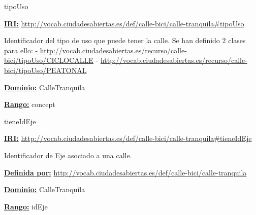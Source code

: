 \begin{mybox}{tipoUso}
\begin{flushleft}
\underline{\textbf{IRI:}}
\url{http://vocab.ciudadesabiertas.es/def/calle-bici/calle-tranquila#tipoUso}
\newline

Identificador del tipo de uso que puede tener la calle. Se han definido 2 clases para ello:
\newline -	\url{http://vocab.ciudadesabiertas.es/recurso/calle-bici/tipoUso/CICLOCALLE}
\newline -	 \url{http://vocab.ciudadesabiertas.es/recurso/calle-bici/tipoUso/PEATONAL}
\newline



\underline{\textbf{Dominio:}}
\newline CalleTranquila

\underline{\textbf{Rango:}}
		concept


\end{flushleft}
\end{mybox}



\begin{mybox}{tieneIdEje}
\begin{flushleft}
\underline{\textbf{IRI:}}
\url{http://vocab.ciudadesabiertas.es/def/calle-bici/calle-tranquila#tieneIdEje}
\newline

Identificador de Eje asociado a una calle.
\newline

\underline{\textbf{Definida por:}}
\url{http://vocab.ciudadesabiertas.es/def/calle-bici/calle-tranquila}
\newline

\underline{\textbf{Dominio:}}
		CalleTranquila
\newline

\underline{\textbf{Rango:}}
		idEje

\end{flushleft}
\end{mybox}





